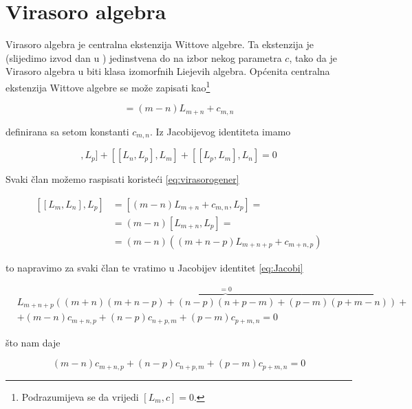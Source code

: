 \chapter{Virasoro algebra}\label{cha:Virasoro}

Virasoro algebra je centralna ekstenzija Wittove algebre. Ta ekstenzija je (slijedimo izvod dan u \citep{de1998lie}) jedinstvena do na izbor nekog parametra $c$, tako da je Virasoro algebra u biti klasa izomorfnih Liejevih algebra. Općenita centralna ekstenzija Wittove algebre se može zapisati kao\footnote{Podrazumijeva se da vrijedi $[L_m,c]=0$.}

\begin{equation}
[L_m,L_n]=(m-n)L_{m+n}+c_{m,n}
\label{eq:virasorogener}
\end{equation}

\noindent definirana sa setom konstanti $c_{m,n}$. Iz Jacobijevog identiteta imamo

\begin{equation}
[[L_m,L_n],L_p]+[[L_n,L_p],L_m]+[[L_p,L_m],L_n]=0
\label{eq:Jacobi}
\end{equation}

\noindent Svaki član možemo raspisati koristeći \eqref{eq:virasorogener}

\begin{equation}
\begin{split}
[[L_m,L_n],L_p]&=[(m-n)L_{m+n}+c_{m,n},L_p]=\\
&=(m-n)[L_{m+n},L_p]=\\
&=(m-n)\left((m+n-p)L_{m+n+p}+c_{m+n,p}\right)
\end{split}
\end{equation}

\noindent to napravimo za svaki član te vratimo u Jacobijev identitet \eqref{eq:Jacobi}

\begin{equation}
\begin{split}
& L_{m+n+p}\overbrace{\left((m+n)(m+n-p)+(n-p)(n+p-m)+(p-m)(p+m-n)\right)}^{=0}+\\
& +(m-n)c_{m+n,p}+(n-p)c_{n+p,m}+(p-m)c_{p+m,n}=0
\end{split}
\end{equation}

\noindent što nam daje

\begin{equation}
(m-n)c_{m+n,p}+(n-p)c_{n+p,m}+(p-m)c_{p+m,n}=0
\label{eq:koefJacob}
\end{equation}

